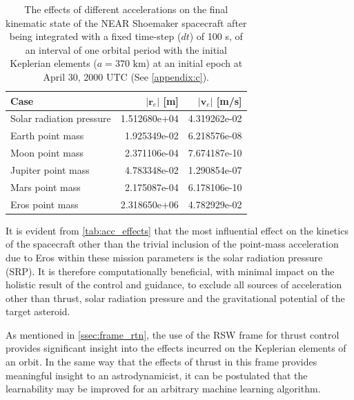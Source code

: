 \begin{table}
    \caption{
        The effects of different accelerations on the final kinematic state of
        the NEAR Shoemaker spacecraft \textmd{after being integrated with a
        fixed time-step ($dt$) of 100 s, of an interval of one orbital period
        with the initial Keplerian elements ($a=370\textrm{ km}$) at an initial
        epoch at April 30, 2000 UTC (See \autoref{appendix:c}).}
    }
    \centering
    \label{tab:acc_effects}
    \begin{tabular}{lrr}

        Case                     & $|\mathbf{r}_{e}|$ [m] & $|\mathbf{v}_{e}|$ [m/s] \\
        \hline\hline
        Solar radiation pressure & 1.512680e+04           & 4.319262e-02             \\
        Earth point mass         & 1.925349e-02           & 6.218576e-08             \\
        Moon point mass          & 2.371106e-04           & 7.674187e-10             \\
        Jupiter point mass       & 4.783348e-02           & 1.290854e-07             \\
        Mars point mass          & 2.175087e-04           & 6.178106e-10             \\
        Eros point mass          & 2.318650e+06           & 4.782929e-02             \\

    \end{tabular}
\end{table}

It is evident from \autoref{tab:acc_effects} that the most influential effect on the kinetics of the spacecraft other than the trivial inclusion of the point-mass acceleration due to Eros within these mission parameters is the solar radiation pressure (SRP). It is therefore computationally beneficial, with minimal impact on the holistic result of the control and guidance, to exclude all sources of acceleration other than thrust, solar radiation pressure and the gravitational potential of the target asteroid.

As mentioned in \autoref{ssec:frame_rtn}, the use of the RSW frame for thrust control provides significant insight into the effects incurred on the Keplerian elements of an orbit. In the same way that the effects of thrust in this frame provides meaningful insight to an astrodynamicist, it can be postulated that the learnability may be improved for an arbitrary machine learning algorithm.

